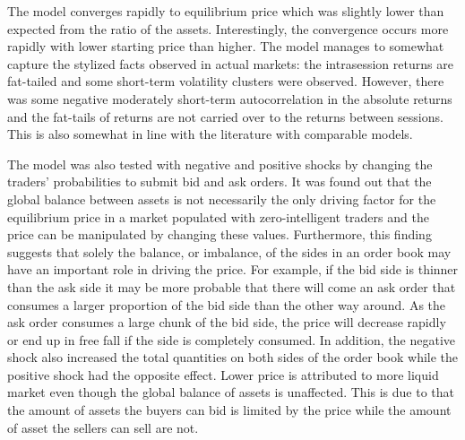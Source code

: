 
The model converges rapidly to equilibrium price which was slightly lower
than expected from the ratio of the assets. Interestingly, the convergence
occurs more rapidly with lower starting price than higher. The model manages 
to somewhat capture the stylized facts observed in actual markets: the intrasession 
returns are fat-tailed and some short-term volatility clusters were observed. 
However, there was some negative moderately short-term autocorrelation in the 
absolute returns and the fat-tails of returns are not carried over to the returns between sessions. 
This is also somewhat in line with the literature with comparable models.

The model was also tested with negative and positive shocks by changing the 
traders' probabilities to submit bid and ask orders. It was found out that
the global balance between assets is not necessarily the only driving factor for the 
equilibrium price in a market populated with zero-intelligent traders 
and the price can be manipulated by changing these values. Furthermore, this finding suggests that 
solely the balance, or imbalance, of the sides in an order book may have an important role in 
driving the price. For example, if the bid side is thinner than the ask side it may be more probable 
that there will come an ask order that consumes a larger proportion of the bid side than the other way 
around. As the ask order consumes a large chunk of the bid side, the price will decrease rapidly 
or end up in free fall if the side is completely consumed. In addition, the negative shock
also increased the total quantities on both sides of the order book while
the positive shock had the opposite effect. Lower price is attributed to 
more liquid market even though the global balance of assets is unaffected.
This is due to that the amount of assets the buyers can bid is limited by the 
price while the amount of asset the sellers can sell are not. 